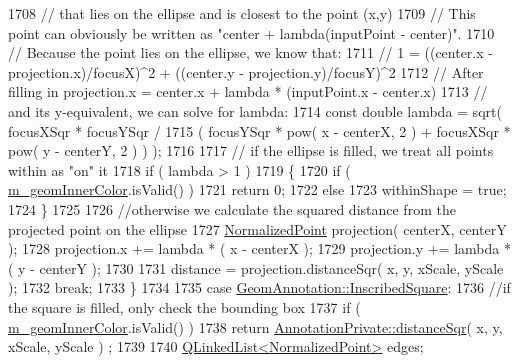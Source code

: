 \begin{DoxyCode}
1708             \textcolor{comment}{// that lies on the ellipse and is closest to the point (x,y)}
1709             \textcolor{comment}{// This point can obviously be written as "center + lambda(inputPoint - center)".}
1710             \textcolor{comment}{// Because the point lies on the ellipse, we know that:}
1711             \textcolor{comment}{//   1 = ((center.x - projection.x)/focusX)^2 + ((center.y - projection.y)/focusY)^2}
1712             \textcolor{comment}{// After filling in projection.x = center.x + lambda * (inputPoint.x - center.x)}
1713             \textcolor{comment}{// and its y-equivalent, we can solve for lambda:}
1714             \textcolor{keyword}{const} \textcolor{keywordtype}{double} lambda = sqrt( focusXSqr * focusYSqr /
1715                                  ( focusYSqr * pow( x - centerX, 2 ) + focusXSqr * pow( y - centerY, 2 ) ) 
      );
1716 
1717             \textcolor{comment}{// if the ellipse is filled, we treat all points within as "on" it}
1718             \textcolor{keywordflow}{if} ( lambda > 1 )
1719             \{
1720                 \textcolor{keywordflow}{if} ( \hyperlink{classOkular_1_1GeomAnnotationPrivate_a78118f508054b9edd36744d8a5c18161}{m\_geomInnerColor}.isValid() )
1721                     \textcolor{keywordflow}{return} 0;
1722                 \textcolor{keywordflow}{else}
1723                     withinShape = \textcolor{keyword}{true};
1724             \}
1725 
1726             \textcolor{comment}{//otherwise we calculate the squared distance from the projected point on the ellipse}
1727             \hyperlink{classOkular_1_1NormalizedPoint}{NormalizedPoint} projection( centerX, centerY );
1728             projection.x += lambda * ( x - centerX );
1729             projection.y += lambda * ( y - centerY );
1730 
1731             distance = projection.distanceSqr( x, y, xScale, yScale );
1732             \textcolor{keywordflow}{break};
1733         \}
1734 
1735         \textcolor{keywordflow}{case} \hyperlink{classOkular_1_1GeomAnnotation_a511623ed10a8d1f18cfd5987fadee682a5c7718299cc7aad186005a1bd0c86e9e}{GeomAnnotation::InscribedSquare}:
1736             \textcolor{comment}{//if the square is filled, only check the bounding box}
1737             \textcolor{keywordflow}{if} ( \hyperlink{classOkular_1_1GeomAnnotationPrivate_a78118f508054b9edd36744d8a5c18161}{m\_geomInnerColor}.isValid() )
1738                 \textcolor{keywordflow}{return} \hyperlink{classOkular_1_1AnnotationPrivate_ab4288200b0dd46f33e4958a64ffac373}{AnnotationPrivate::distanceSqr}( x, y, xScale, yScale )
      ;
1739 
1740             \hyperlink{classQLinkedList}{QLinkedList<NormalizedPoint>} edges;

\end{DoxyCode}
